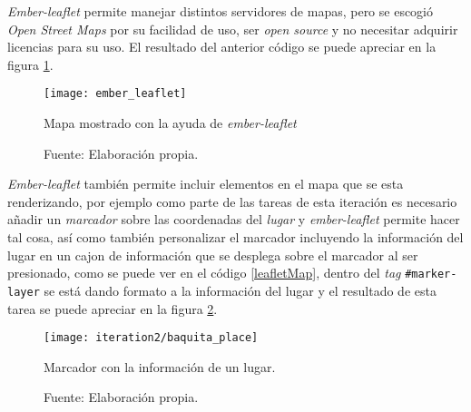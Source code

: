 \emph{Ember-leaflet} permite manejar distintos servidores de mapas, pero se escogió \emph{Open Street Maps} por su facilidad de uso, ser \emph{open source} y no necesitar adquirir licencias para su uso. El resultado del anterior código se puede apreciar en la figura \ref{fig:ember_leaflet}. \\

\begin{figure}[H]
     \begin{center}
       \texttt{[image: ember\_leaflet]}

       \caption{ Mapa mostrado con la ayuda de \emph{ember-leaflet}}
       \label{fig:ember_leaflet}
       \caption*{Fuente: Elaboración propia.}
     \end{center}
\end{figure}


\emph{Ember-leaflet} también permite incluir elementos en el mapa que se esta renderizando, por ejemplo como parte de las tareas de esta iteración es necesario añadir un \emph{marcador} sobre las coordenadas del \emph{lugar} y  \emph{ember-leaflet} permite hacer tal cosa, así como también personalizar el marcador incluyendo la información del lugar en un cajon de informaci\'on que se desplega sobre el marcador al ser presionado, como se puede ver en el código \ref{leafletMap}, dentro del \emph{tag} \verb|#marker-layer| se está dando formato a la información del lugar y el resultado de esta tarea se puede apreciar en la figura \ref{fig:baquita_place}. \\


\begin{figure}[H]
 \begin{center}
   \texttt{[image: iteration2/baquita\_place]}
   \caption{Marcador con la información de un lugar.}
   \label{fig:baquita_place}
   \caption*{Fuente: Elaboración propia.}
 \end{center}
\end{figure}









